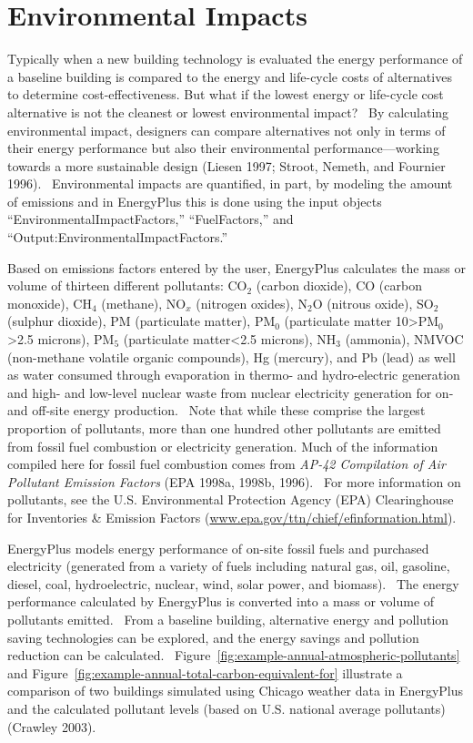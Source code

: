 \section{Environmental Impacts}\label{environmental-impacts}

Typically when a new building technology is evaluated the energy performance of a baseline building is compared to the energy and life-cycle costs of alternatives to determine cost-effectiveness. But what if the lowest energy or life-cycle cost alternative is not the cleanest or lowest environmental impact?~ By calculating environmental impact, designers can compare alternatives not only in terms of their energy performance but also their environmental performance---working towards a more sustainable design (Liesen 1997; Stroot, Nemeth, and Fournier 1996).~ Environmental impacts are quantified, in part, by modeling the amount of emissions and in EnergyPlus this is done using the input objects ``EnvironmentalImpactFactors,'' ``FuelFactors,'' and ``Output:EnvironmentalImpactFactors.''

Based on emissions factors entered by the user, EnergyPlus calculates the mass or volume of thirteen different pollutants: CO\(_{2}\) (carbon dioxide), CO (carbon monoxide), CH\(_{4}\) (methane), NO\(_{x}\) (nitrogen oxides), N\(_{2}\)O (nitrous oxide), SO\(_{2}\) (sulphur dioxide), PM (particulate matter), PM\(_{0}\) (particulate matter 10\textgreater{}PM\(_{0}\)\textgreater{}2.5 microns), PM\(_{5}\) (particulate matter\textless{}2.5 microns), NH\(_{3}\) (ammonia), NMVOC (non-methane volatile organic compounds), Hg (mercury), and Pb (lead) as well as water consumed through evaporation in thermo- and hydro-electric generation and high- and low-level nuclear waste from nuclear electricity generation for on- and off-site energy production.~ Note that while these comprise the largest proportion of pollutants, more than one hundred other pollutants are emitted from fossil fuel combustion or electricity generation. Much of the information compiled here for fossil fuel combustion comes from \emph{AP-42 Compilation of Air Pollutant Emission Factors} (EPA 1998a, 1998b, 1996).~ For more information on pollutants, see the U.S. Environmental Protection Agency (EPA) Clearinghouse for Inventories \& Emission Factors (\href{http://www.epa.gov/ttn/chief/efinformation.html}{www.epa.gov/ttn/chief/efinformation.html}).

EnergyPlus models energy performance of on-site fossil fuels and purchased electricity (generated from a variety of fuels including natural gas, oil, gasoline, diesel, coal, hydroelectric, nuclear, wind, solar power, and biomass).~ The energy performance calculated by EnergyPlus is converted into a mass or volume of pollutants emitted.~ From a baseline building, alternative energy and pollution saving technologies can be explored, and the energy savings and pollution reduction can be calculated.~ Figure~\ref{fig:example-annual-atmospheric-pollutants} and Figure~\ref{fig:example-annual-total-carbon-equivalent-for} illustrate a comparison of two buildings simulated using Chicago weather data in EnergyPlus and the calculated pollutant levels (based on U.S. national average pollutants) (Crawley 2003).

